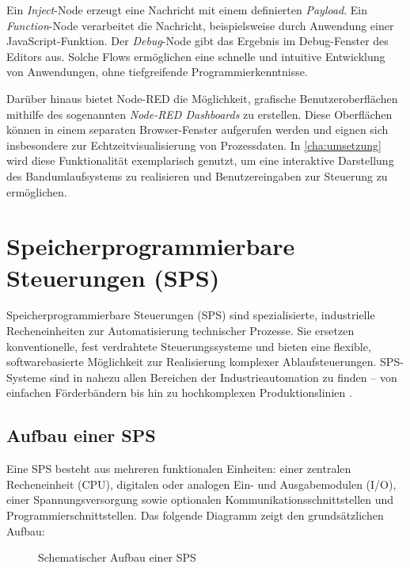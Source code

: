 Ein \emph{Inject}-Node erzeugt eine Nachricht mit einem definierten \emph{Payload}. Ein \emph{Function}-Node verarbeitet die Nachricht, beispielsweise durch Anwendung einer JavaScript-Funktion. Der \emph{Debug}-Node gibt das Ergebnis im Debug-Fenster des Editors aus. Solche Flows ermöglichen eine schnelle und intuitive Entwicklung von Anwendungen, ohne tiefgreifende Programmierkenntnisse.

Darüber hinaus bietet Node-RED die Möglichkeit, grafische Benutzeroberflächen mithilfe des sogenannten \emph{Node-RED Dashboards} zu erstellen. Diese Oberflächen können in einem separaten Browser-Fenster aufgerufen werden und eignen sich insbesondere zur Echtzeitvisualisierung von Prozessdaten. In  \autoref{cha:umsetzung} wird diese Funktionalität exemplarisch genutzt, um eine interaktive Darstellung des Bandumlaufsystems zu realisieren und Benutzereingaben zur Steuerung zu ermöglichen.

\section{Speicherprogrammierbare Steuerungen (SPS)}
\label{sec:sps}

Speicherprogrammierbare Steuerungen (SPS) sind spezialisierte, industrielle Recheneinheiten zur Automatisierung technischer Prozesse. Sie ersetzen konventionelle, fest verdrahtete Steuerungssysteme und bieten eine flexible, softwarebasierte Möglichkeit zur Realisierung komplexer Ablaufsteuerungen. SPS-Systeme sind in nahezu allen Bereichen der Industrieautomation zu finden – von einfachen Förderbändern bis hin zu hochkomplexen Produktionslinien \autocite{siemensSCEGuide}.

\subsection{Aufbau einer SPS}

Eine SPS besteht aus mehreren funktionalen Einheiten: einer zentralen Recheneinheit (CPU), digitalen oder analogen Ein- und Ausgabemodulen (I/O), einer Spannungsversorgung sowie optionalen Kommunikationsschnittstellen und Programmierschnittstellen. Das folgende Diagramm zeigt den grundsätzlichen Aufbau:

\begin{figure}[H]
	\centering
	\caption{Schematischer Aufbau einer SPS}
	\label{fig:sps_aufbau}
\end{figure}

